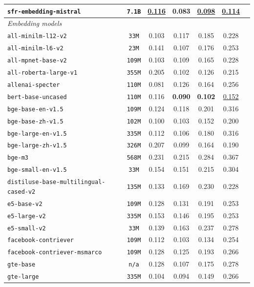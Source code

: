 \documentclass[11pt]{article}
\begin{document}
\begin{table}[htbp]
{\begin{tabular}{lcccccc}
\texttt{sfr-embedding-mistral} & \texttt{7.1B} & \underline{0.116} & \textbf{0.083} & \underline{0.098} & \underline{0.114} \\
\midrule
\multicolumn{6}{l}{\textit{Embedding models}} \\
\midrule
\texttt{all-minilm-l12-v2} & \texttt{33M} & 0.103 & 0.117 & 0.185 & 0.228 \\
\texttt{all-minilm-l6-v2} & \texttt{23M} & 0.141 & 0.107 & 0.176 & 0.253 \\
\texttt{all-mpnet-base-v2} & \texttt{109M} & 0.103 & 0.109 & 0.165 & 0.228 \\
\texttt{all-roberta-large-v1} & \texttt{355M} & 0.205 & 0.102 & 0.126 & 0.215 \\
\texttt{allenai-specter} & \texttt{110M} & 0.081 & 0.126 & 0.164 & 0.256 \\
\texttt{bert-base-uncased} & \texttt{110M} & 0.116 & \textbf{0.090} & \textbf{0.102} & \underline{0.152} \\
\texttt{bge-base-en-v1.5} & \texttt{109M} & 0.124 & 0.118 & 0.201 & 0.316 \\
\texttt{bge-base-zh-v1.5} & \texttt{102M} & 0.100 & 0.103 & 0.152 & 0.200 \\
\texttt{bge-large-en-v1.5} & \texttt{335M} & 0.112 & 0.106 & 0.180 & 0.316 \\
\texttt{bge-large-zh-v1.5} & \texttt{326M} & 0.207 & 0.099 & 0.164 & 0.190 \\
\texttt{bge-m3} & \texttt{568M} & 0.231 & 0.215 & 0.284 & 0.367 \\
\texttt{bge-small-en-v1.5} & \texttt{33M} & 0.154 & 0.151 & 0.215 & 0.304 \\
\texttt{distiluse-base-multilingual-cased-v2} & \texttt{135M} & 0.133 & 0.169 & 0.230 & 0.228 \\
\texttt{e5-base-v2} & \texttt{109M} & 0.128 & 0.131 & 0.191 & 0.253 \\
\texttt{e5-large-v2} & \texttt{335M} & 0.153 & 0.146 & 0.195 & 0.253 \\
\texttt{e5-small-v2} & \texttt{33M} & 0.139 & 0.163 & 0.237 & 0.278 \\
\texttt{facebook-contriever} & \texttt{109M} & 0.112 & 0.103 & 0.134 & 0.254 \\
\texttt{facebook-contriever-msmarco} & \texttt{109M} & 0.128 & 0.125 & 0.193 & 0.266 \\
\texttt{gte-base} & \texttt{n/a} & 0.128 & 0.107 & 0.175 & 0.278 \\
\texttt{gte-large} & \texttt{335M} & 0.104 & 0.094 & 0.149 & 0.266 \\

\end{tabular}}
\end{table}
\end{document}
